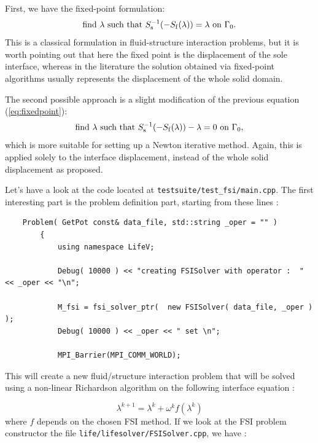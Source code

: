First, we have the fixed-point formulation:
\begin{equation} \label{eq:fixedpoint}
\mbox{find } \lambda \mbox { such that } S_{\mathrm{s}}^{-1}(-S_{\mathrm{f}}(\lambda)) = \lambda
\mbox{ on } \Gamma_0 .
\end{equation}
This is a classical formulation in fluid-structure interaction problems, but it is worth pointing
out that here the fixed point is the displacement of the sole interface, whereas in the
literature the solution obtained via
fixed-point algorithms usually represents the displacement of the whole solid domain.

The second possible approach is a slight modification of the previous equation
(\ref{eq:fixedpoint}):
\begin{equation} \label{eq:newton}
\mbox{find } \lambda \mbox { such that } S_{\mathrm{s}}^{-1}(-S_{\mathrm{f}}(\lambda)) - \lambda = 0 \mbox{ on } \Gamma_0,
\end{equation}
which is more suitable for setting up a Newton iterative method.
Again, this is applied solely to the interface displacement,
instead of the whole solid displacement as proposed.

Let's have a look at the code located at \verb!testsuite/test_fsi/main.cpp!. The first interesting part
is the problem definition part, starting from these lines :
\begin{verbatim}
    Problem( GetPot const& data_file, std::string _oper = "" )
        {
            using namespace LifeV;

            Debug( 10000 ) << "creating FSISolver with operator :  " << _oper << "\n";

            M_fsi = fsi_solver_ptr(  new FSISolver( data_file, _oper ) );
            Debug( 10000 ) << _oper << " set \n";

            MPI_Barrier(MPI_COMM_WORLD);
\end{verbatim}

This will create a new fluid/structure interaction problem that will be solved using a
non-linear Richardson algorithm on the following interface equation :

\begin{equation}\label{eqn-interface}
\lambda^{k+1}  =  \lambda^k + \omega^k f(\lambda^k)
\end{equation}
where $f$ depends on the chosen FSI method. If we look at the FSI problem constructor
the file \verb!life/lifesolver/FSISolver.cpp!, we have :

